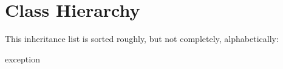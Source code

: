 \section{Class Hierarchy}
This inheritance list is sorted roughly, but not completely, alphabetically\+:\begin{DoxyCompactList}
\item exception\begin{DoxyCompactList}
\item {}
\end{DoxyCompactList}
\item {}
\end{DoxyCompactList}
